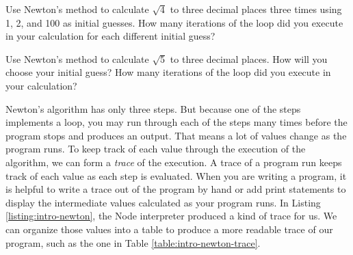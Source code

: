 \begin{question}
Use Newton's method to calculate $\sqrt{4}$ to three decimal places three times
using 1, 2, and 100 as initial guesses. How many iterations of the loop did you
execute in your calculation for each different initial guess?
\end{question}

\begin{question}
Use Newton's method to calculate $\sqrt{5}$ to three decimal places. How will
you choose your initial guess? How many iterations of the loop did you execute
in your calculation?
\end{question}


Newton's algorithm has only three steps. But because one of the steps implements
a loop, you may run through each of the steps many times before the program
stops and produces an output. That means a lot of values change as the program
runs. To keep track of each value through the execution of the algorithm, we can
form a \emph{trace} of the execution. A trace of a program run keeps track of
each value as each step is evaluated. When you are writing a program, it is
helpful to write a trace out of the program by hand or add print statements to
display the intermediate values calculated as your program runs. In Listing
\ref{listing:intro-newton}, the Node interpreter produced a kind of trace for
us. We can organize those values into a table to produce a more readable trace
of our program, such as the one in Table \ref{table:intro-newton-trace}.

